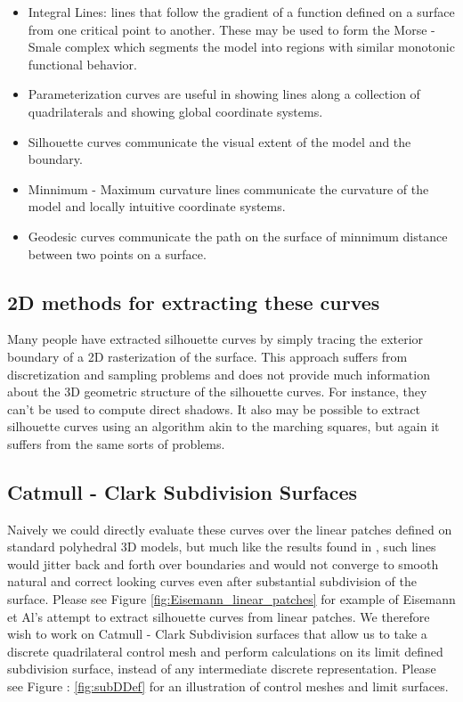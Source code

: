 \documentclass[12pt, letterpaper]{article}
\begin{document}
\begin{itemize}
	\item		Integral Lines: lines that follow the gradient of a function defined on a surface from one critical point to another. These may be used to form the Morse - Smale complex
			which segments the model into regions with similar monotonic functional behavior.
	\item		Parameterization curves are useful in showing lines along a collection of quadrilaterals and showing global coordinate systems.
	\item 	Silhouette curves communicate the visual extent of the model and the boundary.
	\item 	Minnimum - Maximum curvature lines communicate the curvature of the model and locally intuitive coordinate systems.
	\item        Geodesic curves communicate the path on the surface of minnimum distance between two points on a surface.
\end{itemize}

	\subsection{2D methods for extracting these curves}

		Many people have extracted silhouette curves by simply tracing the exterior boundary of a 2D rasterization of the surface. This approach suffers from 
		discretization and sampling problems and does not provide much information about the 3D geometric structure of the silhouette curves.
		For instance, they can't be used to compute direct shadows.
		It also may be possible to extract silhouette curves using an algorithm akin to the marching squares, but again it suffers from the same sorts of problems.
	
	\subsection{Catmull - Clark Subdivision Surfaces}
	
		Naively we could directly evaluate these curves over the linear patches defined on standard polyhedral 3D models,
		but much like the results found in \cite{Eisemann08},
		such lines would jitter back and forth over boundaries and would not converge to smooth natural and correct looking curves even after substantial
		subdivision of the surface. Please see Figure \ref{fig:Eisemann_linear_patches} for example of Eisemann et Al's attempt to extract silhouette
		curves from linear patches. We therefore wish to work on Catmull - Clark Subdivision surfaces that allow us to take a discrete quadrilateral control mesh
		and perform calculations on its limit defined subdivision surface, instead of any intermediate discrete representation.
		Please see Figure : \ref{fig:subDDef} for an illustration of control meshes and limit surfaces.
\end{document}
